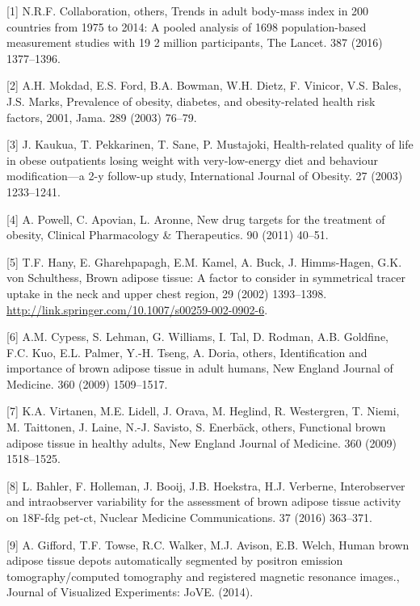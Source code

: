 \documentclass[]{elsarticle} %
\begin{document}
\hypertarget{refs}{}
\hypertarget{ref-ncd2016trends}{}
{[}1{]} N.R.F. Collaboration, others, Trends in adult body-mass index in
200 countries from 1975 to 2014: A pooled analysis of 1698
population-based measurement studies with 19 2 million participants, The
Lancet. 387 (2016) 1377--1396.

\hypertarget{ref-mokdad2003prevalence}{}
{[}2{]} A.H. Mokdad, E.S. Ford, B.A. Bowman, W.H. Dietz, F. Vinicor,
V.S. Bales, J.S. Marks, Prevalence of obesity, diabetes, and
obesity-related health risk factors, 2001, Jama. 289 (2003) 76--79.

\hypertarget{ref-kaukua2003behav}{}
{[}3{]} J. Kaukua, T. Pekkarinen, T. Sane, P. Mustajoki, Health-related
quality of life in obese outpatients losing weight with very-low-energy
diet and behaviour modification---a 2-y follow-up study, International
Journal of Obesity. 27 (2003) 1233--1241.

\hypertarget{ref-powell2011drug}{}
{[}4{]} A. Powell, C. Apovian, L. Aronne, New drug targets for the
treatment of obesity, Clinical Pharmacology \& Therapeutics. 90 (2011)
40--51.

\hypertarget{ref-hany2002}{}
{[}5{]} T.F. Hany, E. Gharehpapagh, E.M. Kamel, A. Buck, J. Himms-Hagen,
G.K. von Schulthess, Brown adipose tissue: A factor to consider in
symmetrical tracer uptake in the neck and upper chest region, 29 (2002)
1393--1398. \url{http://link.springer.com/10.1007/s00259-002-0902-6}.

\hypertarget{ref-cypess2009bat}{}
{[}6{]} A.M. Cypess, S. Lehman, G. Williams, I. Tal, D. Rodman, A.B.
Goldfine, F.C. Kuo, E.L. Palmer, Y.-H. Tseng, A. Doria, others,
Identification and importance of brown adipose tissue in adult humans,
New England Journal of Medicine. 360 (2009) 1509--1517.

\hypertarget{ref-virtanen2009functional}{}
{[}7{]} K.A. Virtanen, M.E. Lidell, J. Orava, M. Heglind, R. Westergren,
T. Niemi, M. Taittonen, J. Laine, N.-J. Savisto, S. Enerbäck, others,
Functional brown adipose tissue in healthy adults, New England Journal
of Medicine. 360 (2009) 1518--1525.

\hypertarget{ref-bahler2016batsuv}{}
{[}8{]} L. Bahler, F. Holleman, J. Booij, J.B. Hoekstra, H.J. Verberne,
Interobserver and intraobserver variability for the assessment of brown
adipose tissue activity on 18F-fdg pet-ct, Nuclear Medicine
Communications. 37 (2016) 363--371.

\hypertarget{ref-gifford2014auto}{}
{[}9{]} A. Gifford, T.F. Towse, R.C. Walker, M.J. Avison, E.B. Welch,
Human brown adipose tissue depots automatically segmented by positron
emission tomography/computed tomography and registered magnetic
resonance images., Journal of Visualized Experiments: JoVE. (2014).
\end{document}
